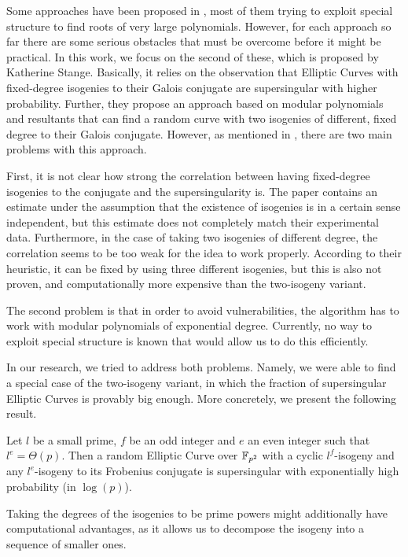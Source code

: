 Some approaches have been proposed in \cite{base_paper}, most of them trying to exploit special structure to find roots of very large polynomials.
However, for each approach so far there are some serious obstacles that must be overcome before it might be practical.
In this work, we focus on the second of these, which is proposed by Katherine Stange.
Basically, it relies on the observation that Elliptic Curves with fixed-degree isogenies to their Galois conjugate are supersingular with higher probability.
Further, they propose an approach based on modular polynomials and resultants that can find a random curve with two isogenies of different, fixed degree to their Galois conjugate.
However, as mentioned in \cite{base_paper}, there are two main problems with this approach.

First, it is not clear how strong the correlation between having fixed-degree isogenies to the conjugate and the supersingularity is.
The paper contains an estimate under the assumption that the existence of isogenies is in a certain sense independent, but this estimate does not completely match their experimental data.
Furthermore, in the case of taking two isogenies of different degree, the correlation seems to be too weak for the idea to work properly.
According to their heuristic, it can be fixed by using three different isogenies, but this is also not proven, and computationally more expensive than the two-isogeny variant.

The second problem is that in order to avoid vulnerabilities, the algorithm has to work with modular polynomials of exponential degree.
Currently, no way to exploit special structure is known that would allow us to do this efficiently.

In our research, we tried to address both problems.
Namely, we were able to find a special case of the two-isogeny variant, in which the fraction of supersingular Elliptic Curves is provably big enough.
More concretely, we present the following result.
\begin{prop}
    \label{prop:main_result1}
    Let $l$ be a small prime, $f$ be an odd integer and $e$ an even integer such that $l^e = \Theta(p)$.
    Then a random Elliptic Curve over $\mathbb{F}_{p^2}$ with a cyclic $l^f$-isogeny and any $l^e$-isogeny to its Frobenius conjugate is supersingular with exponentially high probability (in $\log(p)$).
\end{prop}
Taking the degrees of the isogenies to be prime powers might additionally have computational advantages, as it allows us to decompose the isogeny into a sequence of smaller ones.

